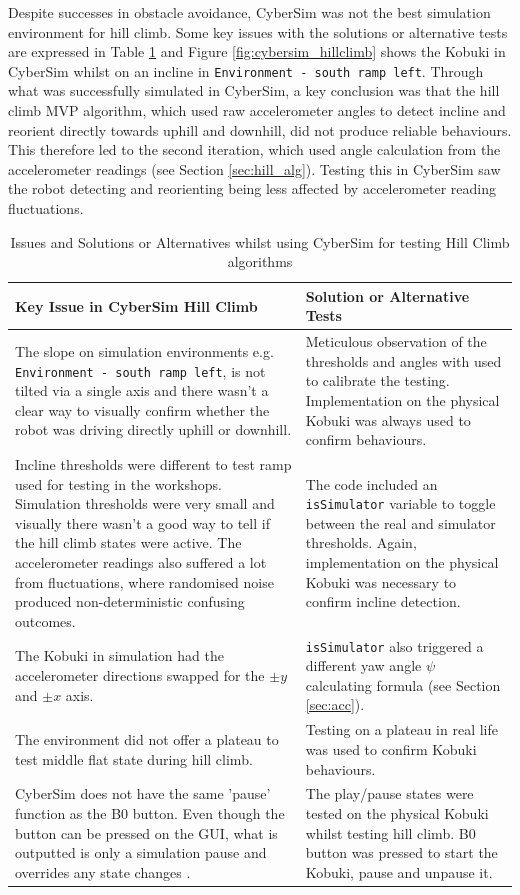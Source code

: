 Despite successes in obstacle avoidance, CyberSim was not the best simulation environment for hill climb. Some key issues with the solutions or alternative tests are expressed in Table \ref{tab:cybersim_hillclimb} and Figure \ref{fig:cybersim_hillclimb} shows the Kobuki in CyberSim whilst on an incline in \texttt{Environment - south ramp left}. Through what was successfully simulated in CyberSim, a key conclusion was that the hill climb MVP algorithm, which used raw accelerometer angles to detect incline and reorient directly towards uphill and downhill, did not produce reliable behaviours. This therefore led to the second iteration, which used angle calculation from the accelerometer readings (see Section \ref{sec:hill_alg}). Testing this in CyberSim saw the robot detecting and reorienting being less affected by accelerometer reading fluctuations.
\begin{table}[H]
\centering
\begin{tabularx}{\textwidth}{|X|X|}
    \hline
    \textbf{Key Issue in CyberSim Hill Climb} & \textbf{Solution or Alternative Tests}\\
    \hline
    The slope on simulation environments e.g. \texttt{Environment - south ramp left}, is not tilted via a single axis and there wasn't a clear way to visually confirm whether the robot was driving directly uphill or downhill. 
    & 
    Meticulous observation of the thresholds and angles with used to calibrate the testing. Implementation on the physical Kobuki was always used to confirm behaviours.\\
    \hline
    Incline thresholds were different to test ramp used for testing in the workshops. Simulation thresholds were very small and visually there wasn't a good way to tell if the hill climb states were active. The accelerometer readings also suffered a lot from fluctuations, where randomised noise produced non-deterministic confusing outcomes.
    &
    The code included an \texttt{isSimulator} variable to toggle between the real and simulator thresholds. Again, implementation on the physical Kobuki was necessary to confirm incline detection.\\
    \hline
    The Kobuki in simulation had the accelerometer directions swapped for the $\pm y$ and $\pm x$ axis.
    &
    \texttt{isSimulator} also triggered a different yaw angle $\psi$ calculating formula (see Section \ref{sec:acc}).\\
    \hline
    The environment did not offer a plateau to test middle flat state during hill climb.
    & 
    Testing on a plateau in real life was used to confirm Kobuki behaviours.\\
    \hline
    CyberSim does not have the same 'pause' function as the B0 button. Even though the button can be pressed on the GUI, what is outputted is only a simulation pause and overrides any state changes \cite[p.~33]{labguide}.
    &
    The play/pause states were tested on the physical Kobuki whilst testing hill climb. B0 button was pressed to start the Kobuki, pause and unpause it.\\
    \hline
\end{tabularx}
\caption{Issues and Solutions or Alternatives whilst using CyberSim for testing Hill Climb algorithms}
\label{tab:cybersim_hillclimb}
\end{table}
